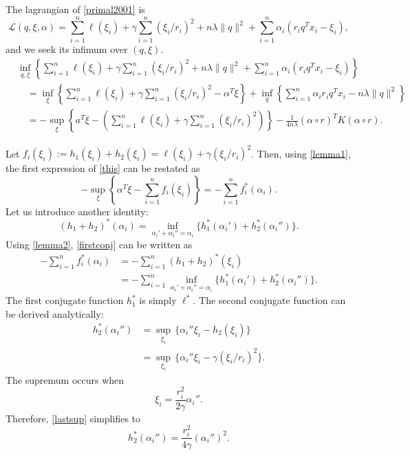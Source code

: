 \documentclass{article}
\newcommand{\lag}{\mathscr{L}}
\newcommand{\sumi}{\sum_{i=1}^n}
\begin{document}
The lagrangian of \eqref{primal2001} is
\begin{equation}
  \lag(q,\xi,\alpha) = \sumi \ell(\xi_i) + \gamma\sumi(\xi_i/r_i)^2 + n\lambda\|q\|^2 + \sumi \alpha_i(r_iq^Tx_i - \xi_i),
\end{equation}
and we seek its infimum over $(q,\xi)$.
\begin{align}
  &\inf_{q,\xi} \left\{\sumi \ell(\xi_i) + \gamma\sumi (\xi_i/r_i)^2 + n\lambda\|q\|^2 + \sumi \alpha_i(r_iq^Tx_i -
    \xi_i)\right\}\\
  &\quad =\inf_\xi\left\{\sumi \ell(\xi_i) + \gamma\sumi(\xi_i/r_i)^2 - \alpha^T\xi\right\} + \inf_q\left\{\sumi
    \alpha_ir_iq^Tx_i - n\lambda\|q\|^2\right\}\\
  &\quad = - \sup_\xi\left\{a^T\xi - \left(\sumi \ell(\xi_i) + \gamma\sumi(\xi_i/r_i)^2\right)\right\}
    - \frac{1}{4n\lambda} (\alpha \circ r)^TK(\alpha \circ r)\label{this}.
\end{align}

Let $f_i(\xi_i) := h_1(\xi_i)+ h_2(\xi_i) = \ell(\xi_i) + \gamma(\xi_i/r_i)^2$. Then, using \eqref{lemma1},
the first expression of \eqref{this} can be restated as
\begin{equation}
  \label{firstconj}
  -\sup_\xi\left\{\alpha^T \xi - \sumi f_i(\xi_i)\right\} = -\sumi f_i^*(\alpha_i).
\end{equation}
Let us introduce another identity:
\begin{equation}
  \label{lemma2}
  (h_1+h_2)^*(\alpha_i) = \inf_{\alpha_i'+\alpha_i''=\alpha_i} \{h_1^*(\alpha_i') + h_2^*(\alpha_i'')\}.
\end{equation}
Using \eqref{lemma2}, \eqref{firstconj} can be written as
\begin{align}
  -\sumi f_i^*(\alpha_i) &= -\sumi (h_1+h_2)^*(\xi_i)\\
                    &= -\sumi \inf_{\alpha_i'+\alpha_i''=\alpha_i} \{h_1^*(\alpha_i') + h_2^*(\alpha_i'')\}.
\end{align}
The first conjugate function $h_1^*$ is simply $\ell^*$. The second conjugate function can be
derived analytically:
\begin{align}
  h_2^*(\alpha_i'') &= \sup_{\xi_i}\,\{\alpha_i''\xi_i - h_2(\xi_i)\}\\
               &= \sup_{\xi_i}\,\{\alpha_i''\xi_i - \gamma(\xi_i/r_i)^2\}\label{lastsup}.
\end{align}
The supremum occurs when
\begin{equation}
  \label{supconj}
  \xi_i = \frac{r_i^2}{2\gamma}\alpha_i''.
\end{equation}
Therefore, \eqref{lastsup} simplifies to
\begin{equation}
  h_2^*(\alpha_i'') = \frac{r_i^2}{4\gamma}(\alpha_i'')^2.
\end{equation}
\end{document}
